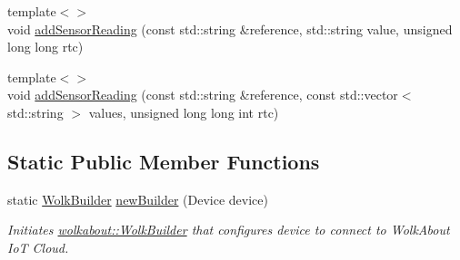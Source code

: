 \begin{DoxyCompactItemize}
\item 
{\footnotesize template$<$$>$ }\\void \hyperlink{classwolkabout_1_1_wolk_a4704e782ac13a380a6d7ccdbabb3847e}{add\+Sensor\+Reading} (const std\+::string \&reference, std\+::string value, unsigned long long rtc)
\item 
{\footnotesize template$<$$>$ }\\void \hyperlink{classwolkabout_1_1_wolk_ac55d5659566c66a513cdbb2e29833028}{add\+Sensor\+Reading} (const std\+::string \&reference, const std\+::vector$<$ std\+::string $>$ values, unsigned long long int rtc)
\end{DoxyCompactItemize}
\subsection*{Static Public Member Functions}
\begin{DoxyCompactItemize}
\item 
static \hyperlink{classwolkabout_1_1_wolk_builder}{Wolk\+Builder} \hyperlink{classwolkabout_1_1_wolk_a91270bb8552c2dee634e552111db4bb0}{new\+Builder} (Device device)
\begin{DoxyCompactList}\small\item\em Initiates \hyperlink{classwolkabout_1_1_wolk_builder}{wolkabout\+::\+Wolk\+Builder} that configures device to connect to Wolk\+About IoT Cloud. \end{DoxyCompactList}\end{DoxyCompactItemize}
